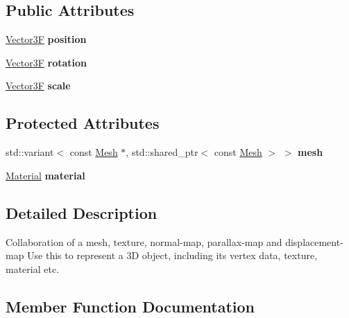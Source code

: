 \subsection*{Public Attributes}
\begin{DoxyCompactItemize}
\item 
\mbox{\label{class_object_a45eaeffd7566fa587d51d47c5c96bdb9}} 
\mbox{\hyperlink{class_vector3}{Vector3F}} {\bfseries position}
\item 
\mbox{\label{class_object_a753e310c91ea32c22d83a0d241c58cef}} 
\mbox{\hyperlink{class_vector3}{Vector3F}} {\bfseries rotation}
\item 
\mbox{\label{class_object_a0e8e71418972efbeabe00977dfffa366}} 
\mbox{\hyperlink{class_vector3}{Vector3F}} {\bfseries scale}
\end{DoxyCompactItemize}
\subsection*{Protected Attributes}
\begin{DoxyCompactItemize}
\item 
\mbox{\label{class_object_a4ad1e55e5b3499749f4e78caef74b9c3}} 
std\+::variant$<$ const \mbox{\hyperlink{class_mesh}{Mesh}} $\ast$, std\+::shared\+\_\+ptr$<$ const \mbox{\hyperlink{class_mesh}{Mesh}} $>$ $>$ {\bfseries mesh}
\item 
\mbox{\label{class_object_a2f63d05a9a9264e1b6c388fa4bba4e91}} 
\mbox{\hyperlink{class_material}{Material}} {\bfseries material}
\end{DoxyCompactItemize}


\subsection{Detailed Description}
Collaboration of a mesh, texture, normal-\/map, parallax-\/map and displacement-\/map Use this to represent a 3D object, including its vertex data, texture, material etc. 

\subsection{Member Function Documentation}
\mbox{\label{class_object_adb2402094daa6f7e392c47236d7fef61}} 
